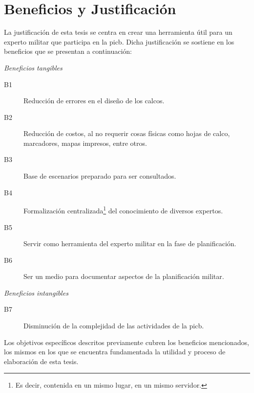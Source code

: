 \section{Beneficios y Justificación}

La justificación de esta tesis se centra en crear una herramienta útil para un experto militar que participa en la \gls{picb}. Dicha justificación se sostiene en los beneficios que se presentan a continuación:

\emph{\footnotesize Beneficios tangibles}
\begin{description}
\item[B1] Reducción de errores en el diseño de los calcos.
\item[B2] Reducción de costos, al no requerir cosas físicas como hojas de calco, marcadores, mapas impresos, entre otros.
\item[B3] Base de escenarios preparado para ser consultados.
\item[B4] Formalización centralizada\footnote{Es decir, contenida en un mismo lugar, en un mismo servidor.}  del conocimiento de diversos expertos.
\item[B5] Servir como herramienta del experto militar en la fase de planificación.
\item[B6] Ser un medio para documentar aspectos de la planificación militar.

\end{description}

\emph{\footnotesize Beneficios intangibles}
\begin{description}
\item[B7] Disminución de la complejidad de las actividades de la \gls{picb}.
\end{description}

Los objetivos específicos descritos previamente cubren los beneficios mencionados, los mismos en los que se encuentra fundamentada la utilidad y proceso de elaboración de esta tesis.


